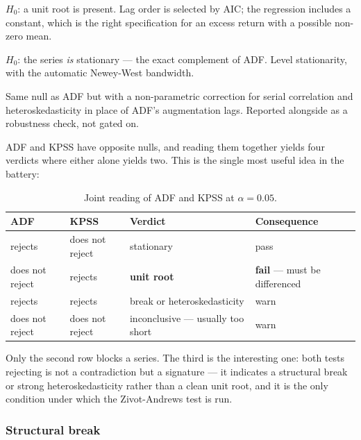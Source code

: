 \begin{description}[leftmargin=1.6em,style=nextline,itemsep=0.35ex]
\item[Augmented Dickey-Fuller \citep{dickey1979}.] $H_0$: a unit root is present. Lag
  order is selected by AIC; the regression includes a constant, which is the right
  specification for an excess return with a possible non-zero mean.
\item[KPSS \citep{kpss1992}.] $H_0$: the series \emph{is} stationary --- the exact
  complement of ADF. Level stationarity, with the automatic Newey-West bandwidth.
\item[Phillips-Perron \citep{phillips1988}.] Same null as ADF but with a
  non-parametric correction for serial correlation and heteroskedasticity in place of
  ADF's augmentation lags. Reported alongside as a robustness check, not gated on.
\end{description}

ADF and KPSS have opposite nulls, and reading them together yields four verdicts where
either alone yields two. This is the single most useful idea in the battery:

\begin{table}[htbp]
\centering
\small
\caption{Joint reading of ADF and KPSS at $\alpha = 0.05$.}
\begin{tabular}{@{}llll@{}}
\toprule
\textbf{ADF} & \textbf{KPSS} & \textbf{Verdict} & \textbf{Consequence} \\
\midrule
rejects & does not reject & stationary & pass \\
does not reject & rejects & \textbf{unit root} & \textbf{fail} --- must be differenced \\
rejects & rejects & break or heteroskedasticity & warn \\
does not reject & does not reject & inconclusive --- usually too short & warn \\
\bottomrule
\end{tabular}
\end{table}

Only the second row blocks a series. The third is the interesting one: both tests
rejecting is not a contradiction but a signature --- it indicates a structural break or
strong heteroskedasticity rather than a clean unit root, and it is the only condition
under which the Zivot-Andrews test is run.

\subsubsection{Structural break}

